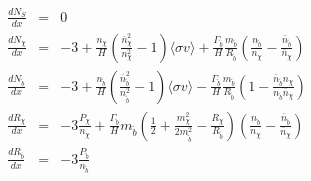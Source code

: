 \documentclass[preprint,notoc]{JHEP3}
\def\tb{\tilde b}
\def\tb{{\tilde{b}}}
\def\dm{{\chi}}
\begin{document}
\begin{eqnarray*}
\frac{d N_S}{d x} & = & 0\\
\frac{d N_\dm}{d x} & = & -3
+ \frac{n_\dm}{H}\left( \frac{\bar{n}_{\dm}^2}{n_{\dm}^2} -1 \right) \langle \sigma v \rangle 
+  \frac{\Gamma_\tb}{H} \frac{m_\tb}{R_\tb} \left(\frac{n_\tb}{n_\dm} - \frac{\bar{n}_\tb}{\bar{n}_\dm}  \right) \\
\frac{d N_\tb}{d x} & = & -3
+ \frac{n_\tb}{H}\left( \frac{\bar{n}_{\tb}^2}{n_{\tb}^2} -1 \right) \langle \sigma v \rangle 
-  \frac{\Gamma_\tb}{H} \frac{m_\tb}{R_\tb} \left( 1 - \frac{\bar{n}_\tb n_\dm}{n_\tb \bar{n}_\dm}  \right)\\
\frac{ d R_\dm}{d x} & = &   -3 \frac{P_\dm}{n_\dm} +  \frac{\Gamma_\tb}{H} m_\tb \left( \frac{1}{2} + \frac{m_\dm^2}{2 m_\tb^2}- \frac{R_\dm}{R_\tb} \right) \left(\frac{n_\tb}{n_\dm} - \frac{\bar{n}_\tb}{\bar{n}_\dm}  \right) \\
\frac{ d R_\tb}{d x} & = &   -3 \frac{P_\tb}{n_\tb}
\end{eqnarray*}
\end{document}
